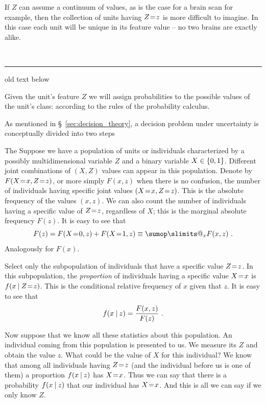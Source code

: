 \documentclass[\ifafour a4paper,12pt,\else a5paper,10pt,\fi%
onecolumn,oneside,article,%
british%
]{memoir}
\makeatletter
\theoremstyle{remark}
\theoremstyle{innote}
\def\sum{\DOTSI\sumop\slimits@}
\DeclarePairedDelimiter\set{\{}{\}} %
\renewcommand*{\|}[1][]{\nonscript\:#1\vert\nonscript\:\mathopen{}}
\newcommand*{\mo}[1][=]{\mathrel{\mkern-3.5mu#1\mkern-3.5mu}}
\newcommand*{\sect}{\S}%
\newcommand*{\wrench}{{\fontencoding{U}\fontfamily{fontawesomethree}\selectfont\symbol{114}}}
\newcommand{\mynotew}[1]{{\footnotesize\color{notecolour}\wrench\ #1}}
\makeatother
\begin{document}
If $Z$ can assume a continuum of values, as is the case for a brain scan for example, then the collection of units having $Z\mo z$ is more difficult to imagine. In this case each unit will be unique in its feature value -- no two brains are exactly alike.




\mynotew{\medskip\hrule old text below}

Given the unit's feature $Z$ we will assign probabilities to the possible values of the unit's class:  according to the rules of the probability calculus.

As mentioned in \sect~\ref{sec:decision_theory}, a decision problem under uncertainty is conceptually divided into two steps 

The Suppose we have a population of units or individuals characterized by a possibly multidimensional variable $Z$ and a binary variable $X \in \set{0,1}$. Different joint combinations of $(X,Z)$ values can appear in this population. Denote by $F(X\mo x, Z\mo z)$, or more simply $F(x, z)$ when there is no confusion, the number of individuals having specific joint values $(X\mo x, Z\mo z)$. This is the absolute frequency of the values $(x,z)$. We can also count the number of individuals having a specific value of $Z\mo z$, regardless of $X$; this is the marginal absolute frequency $F(z)$. It is easy to see that
\begin{equation}
  \label{eq:marginal_prob}
  F(z) = F(X\mo 0, z) + F(X\mo 1, z) \equiv \sum_{x} F(x,z)\ .
\end{equation}
Analogously for $F(x)$.

Select only the subpopulation of individuals that have a specific value $Z\mo z$. In this subpopulation, the \emph{proportion} of individuals having a specific value $X\mo x$ is $f(x\| Z\mo z)$. This is the conditional relative frequency of $x$ given that $z$. It is easy to see that
\begin{equation}
  \label{eq:cond_prob}
  f(x \| z) = \frac{F(x,z)}{F(z)} \ .
\end{equation}

Now suppose that we know all these statistics about this population. An
individual coming from this population is presented to us. We measure its
$Z$ and obtain the value $z$. What could be the value of $X$ for this
individual? We know that among all individuals having $Z\mo z$ (and the
individual before us is one of them) a proportion $f(x \| z)$ has $X\mo x$.
Thus we can say that there is a probability $f(x \| z)$ that our individual
has $X\mo x$. And this is all we can say if we only know $Z$.
\end{document}
